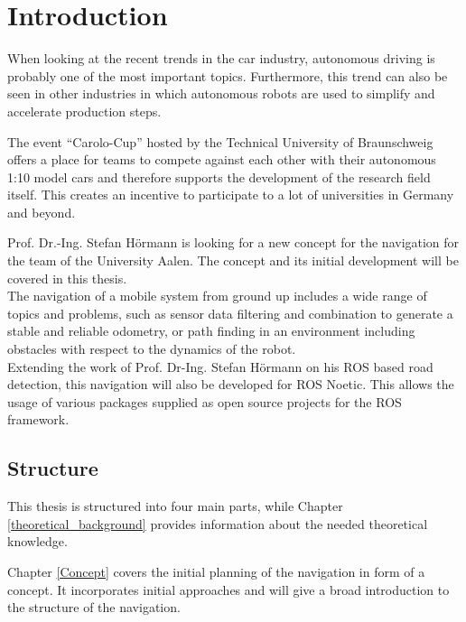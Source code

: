 \chapter{Introduction}
\label{introduction}

When looking at the recent trends in the car industry, autonomous driving is probably one of the most important topics. Furthermore, this trend can also be seen in other industries  in which autonomous robots are used to simplify and accelerate production steps. 



The event ``Carolo-Cup'' hosted by the Technical University of Braunschweig offers a place for teams to compete against each other with their autonomous 1:10 model cars and therefore supports the development of the research field itself. This creates an incentive to participate to a lot of universities in Germany and beyond.\\

Prof. Dr.-Ing. Stefan Hörmann is looking for a new concept for the navigation for the team of the University Aalen. The concept and its initial development will be covered in this thesis.\\
The navigation of a mobile system from ground up includes a wide range of topics and problems, such as sensor data filtering and combination to generate a stable and reliable odometry, or path finding in an environment including obstacles with respect to the dynamics of the robot.\\

Extending the work of Prof. Dr-Ing. Stefan Hörmann on his ROS based road detection, this navigation will also be developed for ROS Noetic. This allows the usage of various packages supplied as open source projects for the ROS framework.

\section{Structure}

This thesis is structured into four main parts, while Chapter \ref{theoretical_background} provides information about the needed theoretical knowledge.


Chapter \ref{Concept} covers the initial planning of the navigation in form of a concept. It incorporates initial approaches and will give a broad introduction to the structure of the navigation.\\

